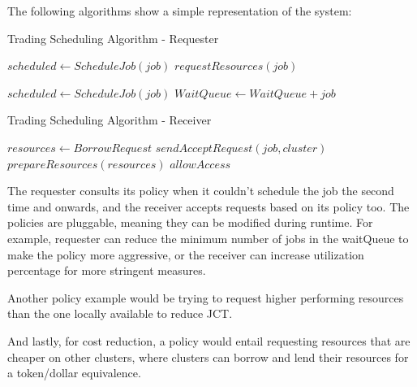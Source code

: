 The following algorithms show a simple representation of the system:

\begin{algorithm}[H]
\caption{Trading Scheduling Algorithm - Requester}
\begin{algorithmic}
        \State $scheduled \gets ScheduleJob(job)$
          
        \State $requestResources(job)$
        \EndIf
    \EndFor

     
        \State $scheduled \gets ScheduleJob(job)$
        \State $WaitQueue \gets WaitQueue + job$
        \EndIf
    \EndFor
\end{algorithmic}
\end{algorithm}

\begin{algorithm}[H]
    \caption{Trading Scheduling Algorithm - Receiver}
    \begin{algorithmic}
            \State $ resources \gets BorrowRequest $ 
             
            \State $sendAcceptRequest(job, cluster)$
            \State $prepareResources(resources)$
            \State $allowAccess$
            \EndIf
    \end{algorithmic}
\end{algorithm} 

The requester consults its policy when it couldn't schedule the job the second time and onwards, and the receiver 
accepts requests based on its policy too. The policies are pluggable, meaning they can be modified during runtime. 
For example, requester can reduce the minimum number of jobs in the waitQueue to make the policy more aggressive, 
or the receiver can increase utilization percentage for more stringent measures.

Another policy example would be trying to request higher performing resources than the one locally available 
to reduce JCT.

And lastly, for cost reduction, a policy would entail requesting resources that are cheaper on other clusters, where 
clusters can borrow and lend their resources for a token/dollar equivalence.
